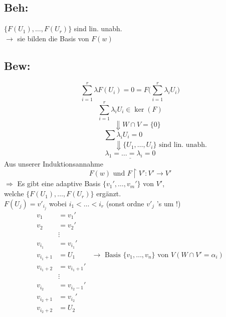\documentclass[titlepage,12pt,a4paper,ngerman]{report}
\newcommand{\tx}[1]{\textrm{#1}}
\begin{document}
\subsection{Beh:}
$ \{F(U_1), \dots , F(U_r) \} $ sind lin. unabh. \\
$ \rightarrow $ sie bilden die Basis von $ F(w) $

\subsection{Bew:}
$$ \sum_{i=1}^{r} \lambda F(U_i) = 0 = F\bigg(\sum_{i=1}^{r} \lambda_i U_i\bigg) $$
$$ \sum_{i=1}^{r} \lambda_i U_i \in \ker (F)$$
$$ \qquad \Downarrow W \cap V = \{0\}$$
$$ \sum \lambda_i U_i = 0 \qquad $$
$$ \qquad \qquad \qquad \qquad \quad  \Downarrow \{ U_1, \dots , U_i\} \tx{ sind lin. unabh. }$$
$$\underline{ \lambda_1 = \dots = \lambda_i = 0 } $$
Aus unserer Induktionsannahme
$$ F(w) \tx{ und } F \upharpoonright V': V' \to V'$$
$ \Rightarrow $ Es gibt eine adaptive Basis $ \{v_1',\dots , v_m'\} $ von $ V'$,\\ welche $ \{F(U_1), \dots , F(U_r) \} $ ergänzt.\\
$ F(U_j) = v' _{i_j} $ wobei $ i_1 < \dots < i_r $ (sonst ordne $ v'_j $ 's um !)
\begin{align*}
v_1 &= v_1' \\
v_2 &= v_2' \\
&\vdots \\
v_{i_1} &= v_{i_1}' \\
v_{i_1 +1} &= U_1 & \rightarrow \tx{ Basis } \{v_1,\dots,v_n\} \tx{ von } V (W\cap V' = {\alpha_i})\\
v_{i_1+2} &= v_{i_1+1}' \\
&\vdots \\
v_{i_2} &= v_{i_2 -1}' \\
v_{i_2+1} &= v_{i_2}' \\
v_{i_2+2} &= U_2 \\
\end{align*}
\end{document}
